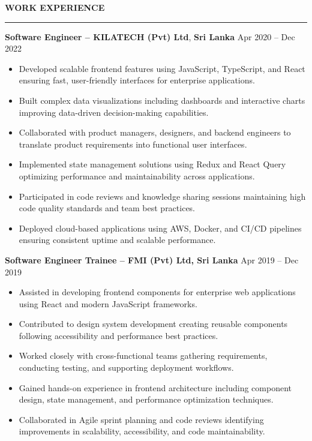 \documentclass[10pt,letterpaper]{article}
\begin{document}
\vspace{8pt}

\textbf{WORK EXPERIENCE}\\[-8pt]
\noindent\rule{\textwidth}{1pt}

\vspace{-2pt}

\textbf{Software Engineer -- KILATECH (Pvt) Ltd}, \textbf{Sri Lanka} \hfill Apr 2020 -- Dec 2022

\vspace{-1pt}

\begin{itemize}
\item Developed scalable frontend features using JavaScript, TypeScript, and React ensuring fast, user-friendly interfaces for enterprise applications.
\item Built complex data visualizations including dashboards and interactive charts improving data-driven decision-making capabilities.
\item Collaborated with product managers, designers, and backend engineers to translate product requirements into functional user interfaces.
\item Implemented state management solutions using Redux and React Query optimizing performance and maintainability across applications.
\item Participated in code reviews and knowledge sharing sessions maintaining high code quality standards and team best practices.
\item Deployed cloud-based applications using AWS, Docker, and CI/CD pipelines ensuring consistent uptime and scalable performance.
\end{itemize}

\textbf{Software Engineer Trainee -- FMI (Pvt) Ltd, Sri Lanka} \hfill Apr 2019 -- Dec 2019

\vspace{-1pt}

\begin{itemize}
\item Assisted in developing frontend components for enterprise web applications using React and modern JavaScript frameworks.
\item Contributed to design system development creating reusable components following accessibility and performance best practices.
\item Worked closely with cross-functional teams gathering requirements, conducting testing, and supporting deployment workflows.
\item Gained hands-on experience in frontend architecture including component design, state management, and performance optimization techniques.
\item Collaborated in Agile sprint planning and code reviews identifying improvements in scalability, accessibility, and code maintainability.
\end{itemize}
\end{document}
